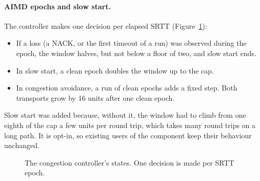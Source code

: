 \paragraph{AIMD epochs and slow start.} The controller makes one decision per elapsed SRTT
(Figure~\ref{fig:ccfsm}):
\begin{itemize}
  \item If a loss (a NACK, or the first timeout of a run) was observed during the epoch, the window halves, but
    not below a floor of two, and slow start ends.
  \item In slow start\vviii, a clean epoch doubles the window up to the cap.
  \item In congestion avoidance, a run of clean epochs adds a fixed step. Both transports grow by 16 units after
    one clean epoch.
\end{itemize}
Slow start was added because, without it, the window had to climb from one eighth of the cap a few units per
round trip, which takes many round trips on a long path. It is opt-in, so existing users of the component keep
their behaviour unchanged.

\begin{figure}[H]
\centering
{}
\caption{The congestion controller's states. One decision is made per SRTT epoch.}\label{fig:ccfsm}
\end{figure}

